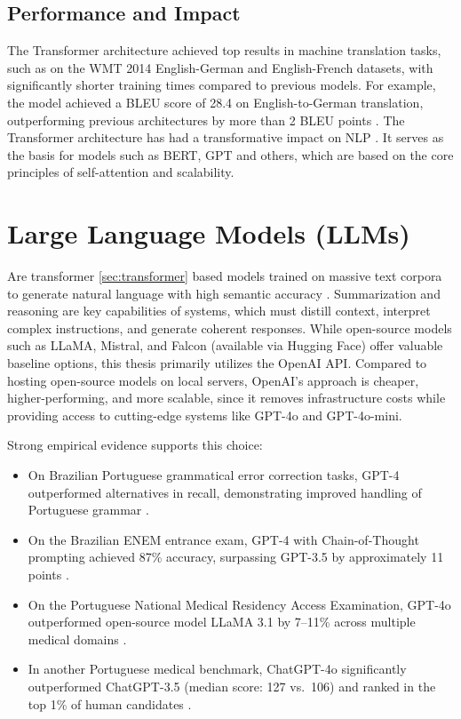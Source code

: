 



\subsection{Performance and Impact}  
The Transformer architecture achieved top results in machine translation tasks, such as on the WMT 2014 English-German and English-French datasets, with significantly shorter training times compared to previous models. For example, the model achieved a BLEU score of 28.4 on English-to-German translation, outperforming previous architectures by more than 2 BLEU points \cite{vaswani2017attention}.  
The Transformer architecture has had a transformative impact on \gls{NLP} . It serves as the basis for  models such as BERT, GPT and others, which are based on the core principles of self-attention and scalability.

\section{Large Language Models (LLMs)}
\label{sec:llm}
Are transformer \ref{sec:transformer} based models trained on massive text corpora to generate natural language with high semantic accuracy \cite{bertpretrainingdeepbidirectional}.
Summarization and reasoning are key capabilities of  systems, which must distill context, interpret complex instructions, and generate coherent responses.
While open-source models such as LLaMA, Mistral, and Falcon (available via Hugging Face) offer valuable baseline options, this thesis primarily utilizes the OpenAI API. Compared to hosting open-source models on local servers, OpenAI’s approach is cheaper, higher-performing, and more scalable, since it removes infrastructure costs while providing access to cutting-edge systems like GPT-4o and GPT-4o-mini.

Strong empirical evidence supports this choice:
\begin{itemize}
  \item On Brazilian Portuguese grammatical error correction tasks, GPT-4 outperformed alternatives in recall, demonstrating improved handling of Portuguese grammar \cite{arxiv2306.15788}.
  \item On the Brazilian ENEM entrance exam, GPT-4 with Chain-of-Thought prompting achieved 87\% accuracy, surpassing GPT-3.5 by approximately 11 points \cite{arxiv2303.17003}.
  \item On the Portuguese National Medical Residency Access Examination, GPT-4o outperformed open-source model LLaMA 3.1 by 7–11\% across multiple medical domains \cite{pmc12166901}.
  \item In another Portuguese medical benchmark, ChatGPT-4o significantly outperformed ChatGPT-3.5 (median score: 127 vs.\ 106) and ranked in the top 1\% of human candidates \cite{amp2025gpt4o}.
\end{itemize}

